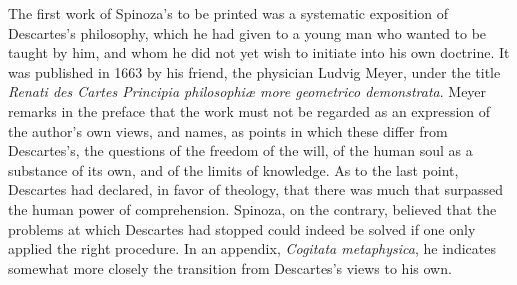 \documentclass[12pt]{book}
\newcommand{\opage}[1]{\marginnote{\footnotesize\textit{[#1]}}}
\begin{document}
The first work of Spinoza's to be printed was a systematic exposition of Descartes's
philosophy, which \opage{30}he had given to a young man who wanted to be taught by
him, and whom he did not yet wish to initiate into his own doctrine. It was published
in 1663 by his friend, the physician Ludvig Meyer, under the title \textit{Renati des
Cartes Principia philosophiæ more geometrico demonstrata}. Meyer remarks in the
preface that the work must not be regarded as an expression of the author's own views,
and names, as points in which these differ from Descartes's, the questions of the
freedom of the will, of the human soul as a substance of its own, and of the limits of
knowledge. As to the last point, Descartes had declared, in favor of theology, that
there was much that surpassed the human power of comprehension. Spinoza, on the
contrary, believed that the problems at which Descartes had stopped could indeed be
solved if one only applied the right procedure. In an appendix, \textit{Cogitata
metaphysica}, he indicates somewhat more closely the transition from Descartes's views
to his own.
\end{document}
